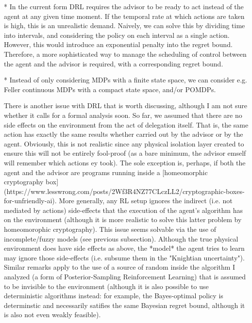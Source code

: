 \documentclass[a4paper]{article}
\begin{document}
* In the current form DRL requires the advisor to be ready to act instead of the agent at any given time moment. If the temporal rate at which actions are taken is high, this is an unrealistic demand. Naively, we can solve this by dividing time into intervals, and considering the policy on each interval as a single action. However, this would introduce an exponential penalty into the regret bound. Therefore, a more sophisticated way to manage the scheduling of control between the agent and the advisor is required, with a corresponding regret bound.

* Instead of only considering MDPs with a finite state space, we can consider e.g. Feller continuous MDPs with a compact state space, and/or POMDPs.

There is another issue with DRL that is worth discussing, although I am not sure whether it calls for a formal analysis soon. So far, we assumed that there are no side effects on the environment from the act of delegation itself. That is, the same action has exactly the same results whether carried out by the advisor or by the agent. Obviously, this is not realistic since any physical isolation layer created to ensure this will not be entirely fool-proof (as a bare minimum, the advisor emself will remember which actions ey took). The sole exception is, perhaps, if both the agent and the advisor are programs running inside a [homeomorphic cryptography box](https://www.lesswrong.com/posts/2Wf3R4NZ77CLczLL2/cryptographic-boxes-for-unfriendly-ai). More generally, any RL setup ignores the indirect (i.e. not mediated by actions) side-effects that the execution of the agent's algorithm has on the environment (although it is more realistic to solve this latter problem by homeomorophic cryptography). This issue seems solvable via the use of incomplete/fuzzy models (see previous subsection). Although the true physical environment does have side effects as above, the *model* the agent tries to learn may ignore those side-effects (i.e. subsume them in the "Knightian uncertainty"). Similar remarks apply to the use of a source of random inside the algorithm I analyzed (a form of Posterior-Sampling Reinforcement Learning) that is assumed to be invisible to the environment (although it is also possible to use deterministic algorithms instead: for example, the Bayes-optimal policy is determinstic and necessarily satifies the same Bayesian regret bound, although it is also not even weakly feasible).
\end{document}
